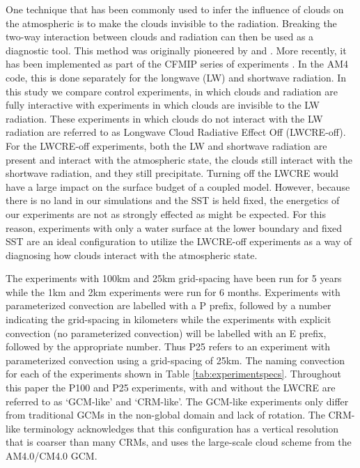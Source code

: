\documentclass[draft]{agujournal2019}
\begin{document}
One technique that has been commonly used to infer the influence of clouds on the atmospheric is to make the clouds invisible to the radiation.  
Breaking the two-way interaction between clouds and radiation can then be used as a diagnostic tool.  
This method was originally pioneered by  and .  
More recently, it has been
implemented as part of the CFMIP series of experiments \cite{Stevens_etal_2012, Webb_etal_2017}.
In the AM4 code, this is done separately for the longwave (LW) and shortwave radiation.  
In this study we compare control experiments, in which clouds and radiation are fully interactive with experiments in which clouds are invisible to the LW radiation.  
These experiments in which clouds do not interact with the LW radiation are referred to as Longwave Cloud Radiative Effect Off (LWCRE-off).  
For the LWCRE-off experiments, both the LW and shortwave radiation are present and interact with 
the atmospheric state, the clouds still interact with the shortwave radiation, and they still precipitate.   
Turning off the LWCRE would have a large impact on the surface budget of a coupled model.  
However, because there is no land in our simulations and the SST is held fixed, the energetics of our experiments are not as
strongly effected as might be expected.  For this reason, experiments with only a water surface at the lower boundary and 
fixed SST are an ideal configuration to utilize the LWCRE-off experiments as a way of diagnosing how clouds interact with 
the atmospheric state.  


The experiments with 100km and 25km grid-spacing have been run for 5 years while the 
1km and 2km experiments were run for 6 months.  Experiments with parameterized convection are labelled with a P prefix, followed
by a number indicating the grid-spacing in kilometers while the experiments with explicit convection (no parameterized convection) will be 
labelled with an E prefix, followed by the appropriate number.  Thus P25 refers to an experiment with parameterized convection using a 
grid-spacing of 25km. %
The naming convection for each of the experiments shown in Table \ref{tab:experimentspecs}.   
Throughout this paper the P100 and P25 experiments, with and without the LWCRE are referred to as `GCM-like' and
`CRM-like'.  The GCM-like experiments only differ from traditional GCMs in the non-global domain and lack of rotation.  
The CRM-like terminology acknowledges that this configuration %
has a vertical resolution that is coarser than many CRMs, and uses the large-scale cloud scheme from the AM4.0/CM4.0 GCM.  
  
\end{document}
